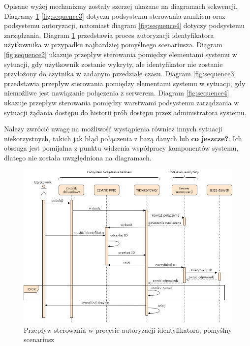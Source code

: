             Opisane wyżej mechanizmy zostały szerzej ukazane na diagramach sekwencji. Diagramy \ref{fig:sequence1}-\ref{fig:sequence3} dotyczą podsystemu sterowania zamkiem oraz podsystemu autoryzacji, natomiast diagram \ref{fig:sequence4} dotyczy podsystemu zarządzania. Diagram \ref{fig:sequence1} przedstawia proces autoryzacji identyfikatora użytkownika w przypadku najbardziej pomyślnego scenariusza. Diagram \ref{fig:sequence2} ukazuje przepływ sterowania pomiędzy elementami systemu w sytuacji, gdy użytkownik zostanie wykryty, ale identyfikator nie zostanie przyłożony do czytnika w zadanym przedziale czasu. Diagram \ref{fig:sequence3} przedstawia przepływ sterowania pomiędzy elementami systemu w sytuacji, gdy niemożliwe jest nawiązanie połączenia z serwerem. Diagram \ref{fig:sequence4} ukazuje przepływ sterowania pomiędzy warstwami podsystemu zarządzania w sytuacji żądania dostępu do historii prób dostępu przez administratora systemu.

            Należy zwrócić uwagę na możliwość wystąpienia również innych sytuacji niekorzystnych, takich jak błąd połączenia z bazą danych lub \textbf{co jeszcze?}. Ich obsługa jest pomijalna z punktu widzenia współpracy komponentów systemu, dlatego nie została uwzględniona na diagramach.

            \begin{figure}[]
                \includegraphics[width=\linewidth]{chapters/images/sequence1.png}
                \caption{Przepływ sterowania w procesie autoryzacji identyfikatora, pomyślny scenariusz}
                \label{fig:sequence1}
            \end{figure}


